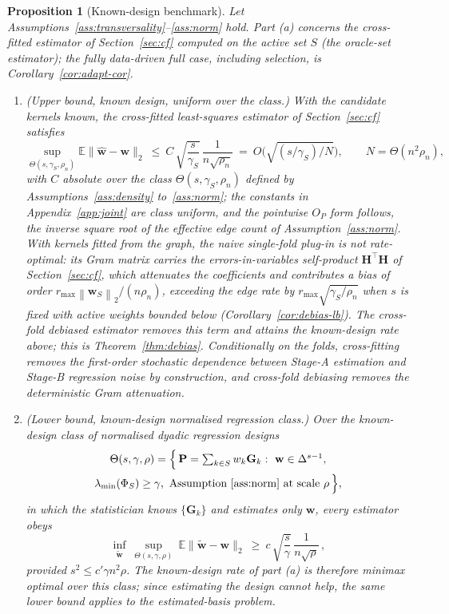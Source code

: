 \documentclass[12pt]{article}
\newtheorem{proposition}{Proposition}
\newcommand{\E}{\mathbb{E}}
\newcommand{\1}{\mathbf{1}}
\newcommand{\Pmat}{\mathbf{P}}
\newcommand{\bw}{\mathbf{w}}
\newcommand{\norm}[1]{\left\lVert#1\right\rVert}
\begin{document}
\begin{proposition}[Known-design benchmark]
\label{thm:joint}
Let Assumptions~\ref{ass:transversality}--\ref{ass:norm} hold. Part (a) concerns the
cross-fitted estimator of Section~\ref{sec:cf} computed on the active set $S$ (the oracle-set
estimator); the fully data-driven full case, including selection, is Corollary~\ref{cor:adapt-cor}.
\begin{enumerate}[label=(\alph*),leftmargin=2em,itemsep=2pt]
\item \emph{(Upper bound, known design, uniform over the class.)} With the candidate kernels known, the
cross-fitted least-squares estimator of Section~\ref{sec:cf} satisfies
\[
\sup_{\Theta(s,\gamma_S,\rho_n)}\E\bigl\|\widehat{\bw}-\bw\bigr\|_2\ \le\ C\,
\sqrt{\frac{s}{\gamma_S}}\,\frac{1}{n\sqrt{\rho_n}}\ =\ O\bigl(\sqrt{(s/\gamma_S)/N}\bigr),\qquad
N=\Theta(n^2\rho_n),
\]
with $C$ absolute over the class $\Theta(s,\gamma_S,\rho_n)$ defined by
Assumptions~\ref{ass:density} to~\ref{ass:norm}; the constants in Appendix~\ref{app:joint} are
class uniform, and the pointwise $O_P$ form follows,
the inverse square root of the effective edge count of Assumption~\ref{ass:norm}. With kernels
\emph{fitted} from the graph, the naive single-fold plug-in is not rate-optimal: its Gram matrix
carries the errors-in-variables self-product $\mathbf H^\top\mathbf H$ of
Section~\ref{sec:cf}, which attenuates the coefficients and contributes a bias of order
$r_{\max}\norm{\bw_S}_2/(n\rho_n)$, exceeding the edge rate by $r_{\max}\sqrt{\gamma_S/\rho_n}$
when $s$ is fixed with active weights bounded below (Corollary~\ref{cor:debias-lb}). The
cross-fold debiased estimator removes this term and attains the known-design rate above; this is
Theorem~\ref{thm:debias}. Conditionally on the folds, cross-fitting removes the first-order
stochastic dependence between Stage-A estimation and Stage-B regression noise by construction, and
cross-fold debiasing removes the deterministic Gram attenuation.
\item \emph{(Lower bound, known-design normalised regression class.)} Over the known-design class of normalised dyadic regression designs
\begin{multline*}
\Theta(s,\gamma,\rho)=\Bigl\{\,\Pmat=\textstyle\sum_{k\in S}w_k\mathbf{G}_k:\ \bw\in\Delta^{s-1},\\
\lambda_{\min}(\Phi_S)\ge\gamma,\ \text{Assumption~\ref{ass:norm} at scale }\rho\,\Bigr\},
\end{multline*}
in which the statistician knows $\{\mathbf{G}_k\}$ and estimates only $\bw$, every estimator obeys
\[
\inf_{\widetilde{\bw}}\ \sup_{\Theta(s,\gamma,\rho)}\ \E\bigl\|\widetilde{\bw}-\bw\bigr\|_2\ \ge\
c\,\sqrt{\frac{s}{\gamma}}\,\frac{1}{n\sqrt{\rho}}\,,
\]
provided $s^2\le c'\gamma n^2\rho$. The known-design rate of part (a) is therefore minimax
optimal over this class; since estimating the design cannot help, the same lower bound applies to
the estimated-basis problem.
\end{enumerate}
\end{proposition}
\end{document}
